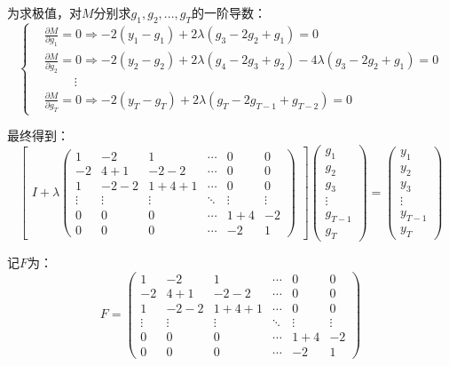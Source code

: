 \documentclass[a4paper,AutoFakeBold,AutoFakeSlant]{ctexart}
\begin{document}
为求极值，对$M$分别求$g_1, g_2,..., g_T$的一阶导数：
\begin{equation}
  \left\{
  \begin{aligned}
    & \frac{\partial M}{\partial g_1} = 0 \Rightarrow -2(y_1-g_1) + 2\lambda(g_3-2g_2+g_1) = 0\\
    & \frac{\partial M}{\partial g_2} = 0 \Rightarrow -2(y_2-g_2) + 2\lambda(g_4-2g_3+g_2) - 4\lambda(g_3-2g_2+g_1) = 0\\
    & \qquad \ \ \vdots \\
    & \frac{\partial M}{\partial g_T} = 0 \Rightarrow -2(y_T-g_T) + 2\lambda(g_T-2g_{T-1}+g_{T-2}) = 0
  \end{aligned}
  \right.
\end{equation}

最终得到：
\begin{equation}
  \begin{bmatrix}
    I + \lambda
    \begin{pmatrix}
      1	&	-2	&	1	&\cdots&	0	&	0 \\
      -2	&	4+1	&	-2-2&\cdots&	0	&	0 \\
      1	&	-2-2&	1+4+1&\cdots&	0	&	0 \\
      \vdots&\vdots&\vdots&\ddots&\vdots&\vdots \\
      0	&	0	&	0	&\cdots&	1+4	&	-2 \\
      0	&	0	&	0	&\cdots&	-2	&	1
    \end{pmatrix}
  \end{bmatrix}
  \begin{pmatrix}
    g_{1}\\g_{2}\\g_{3}\\ \vdots \\g_{T-1}\\g_{T}
  \end{pmatrix}
  =
  \begin{pmatrix}
    y_{1}\\  y_{2}\\  y_{3}\\ \vdots \\  y_{T-1}\\  y_{T}
  \end{pmatrix}
\end{equation}

记$F$为：
\begin{equation*}
  F = 
  \begin{pmatrix}
    1	&	-2	&	1	&\cdots&	0	&	0 \\
    -2	&	4+1	&	-2-2&\cdots&	0	&	0 \\
    1	&	-2-2&	1+4+1&\cdots&	0	&	0 \\
    \vdots&\vdots&\vdots&\ddots&\vdots&\vdots \\
    0	&	0	&	0	&\cdots&	1+4	&	-2 \\
    0	&	0	&	0	&\cdots&	-2	&	1
  \end{pmatrix}
\end{equation*}
\end{document}
